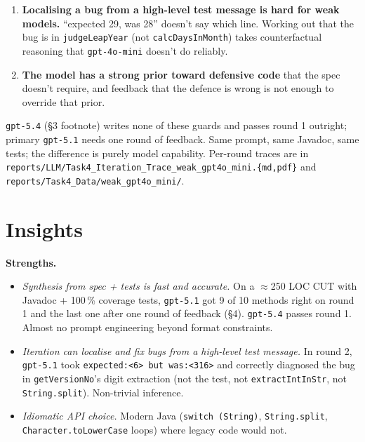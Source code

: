 \documentclass[manuscript,review,nonacm]{acmart}
\begin{document}
\begin{enumerate}\itemsep1pt
\item \textbf{Localising a bug from a high-level test message is hard
      for weak models.} ``expected 29, was 28'' doesn't say which
      line. Working out that the bug is in \texttt{judgeLeapYear}
      (not \texttt{calcDaysInMonth}) takes counterfactual reasoning
      that \texttt{gpt-4o-mini} doesn't do reliably.
\item \textbf{The model has a strong prior toward defensive code}
      that the spec doesn't require, and feedback that the defence is
      wrong is not enough to override that prior.
\end{enumerate}

\texttt{gpt-5.4} (\S3 footnote) writes none of these guards and
passes round 1 outright; primary \texttt{gpt-5.1} needs one round of
feedback. Same prompt, same Javadoc, same tests; the difference is
purely model capability. Per-round traces are in
\texttt{reports/LLM/Task4\_Iteration\_Trace\_weak\_gpt4o\_mini.\{md,pdf\}}
and \texttt{reports/Task4\_Data/weak\_gpt4o\_mini/}.

\section{Insights}

\textbf{Strengths.}
\begin{itemize}\itemsep1pt
\item \emph{Synthesis from spec + tests is fast and accurate.} On a
      $\approx$250 LOC CUT with Javadoc + 100\,\% coverage tests,
      \texttt{gpt-5.1} got 9 of 10 methods right on round 1 and the
      last one after one round of feedback (\S4). \texttt{gpt-5.4}
      passes round 1. Almost no prompt engineering beyond format
      constraints.
\item \emph{Iteration can localise and fix bugs from a high-level
      test message.} In round 2, \texttt{gpt-5.1} took
      \texttt{expected:<6> but was:<316>} and correctly diagnosed the
      bug in \texttt{getVersionNo}'s digit extraction (not the test,
      not \texttt{extractIntInStr}, not \texttt{String.split}).
      Non-trivial inference.
\item \emph{Idiomatic API choice.} Modern Java
      (\texttt{switch (String)}, \texttt{String.split},
      \texttt{Character.toLowerCase} loops) where legacy code would
      not.
\end{itemize}
\end{document}
